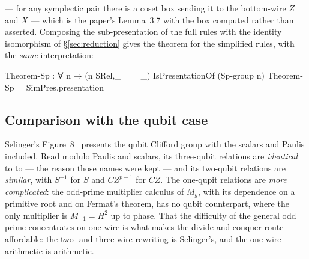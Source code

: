 --- for any symplectic pair there is a coset box sending it to the
bottom-wire $Z$ and $X$ --- which is the paper's Lemma~3.7 with the box
computed rather than asserted.  Composing the sub-presentation of the
full rules with the identity isomorphism of \S\ref{sec:reduction} gives
the theorem for the simplified rules, with the \emph{same}
interpretation:

\begin{agdacode}
Theorem-Sp : ∀ {n} → (n SRel,_===_) IsPresentationOf (Sp-group n)
Theorem-Sp = SimPres.presentation
\end{agdacode}

\subsection{Comparison with the qubit case}

Selinger's Figure~8~\cite{selinger2015clifford} presents the qubit
Clifford group with the scalars and Paulis included.  Read modulo Paulis
and scalars, its three-qubit relations are \emph{identical} to
 to  --- the reason those names were kept ---
and its two-qubit relations are \emph{similar}, with $S^{-1}$ for $S$
and $CZ^{p-1}$ for $CZ$.  The one-qupit relations are \emph{more
complicated}: the odd-prime multiplier calculus of $M_g$, with its
dependence on a primitive root and on Fermat's theorem, has no qubit
counterpart, where the only multiplier is $M_{-1} = H^2$ up to phase.
That the difficulty of the general odd prime concentrates on one wire is
what makes the divide-and-conquer route affordable: the two- and
three-wire rewriting is Selinger's, and the one-wire arithmetic is
arithmetic.
